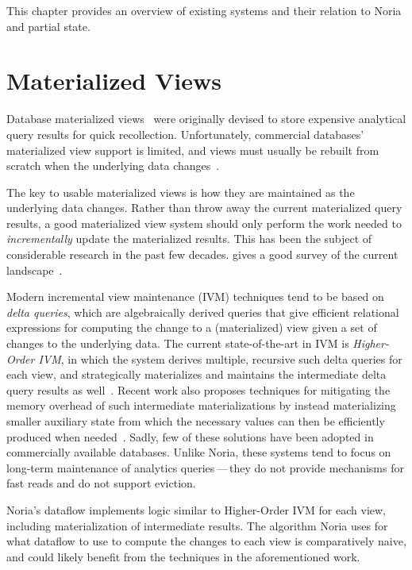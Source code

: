 This chapter provides an overview of existing systems and their relation to
Noria and partial state.

\section{Materialized Views}

Database materialized views~\cite{materialized-views} were originally devised to
store expensive analytical query results for quick recollection. Unfortunately,
commercial databases' materialized view support is limited, and views must
usually be rebuilt from scratch when the underlying data
changes~\cite{materialized-view-selection-sql-server,mssql-materialized-view-restrictions-blog,
mssql-materialized-view-restrictions}.

The key to usable materialized views is how they are maintained as the
underlying data changes. Rather than throw away the current materialized query
results, a good materialized view system should only perform the work needed to
\textit{incrementally} update the materialized results. This has been the
subject of considerable research in the past few decades.
\citeauthor{materialized-survey} gives a good survey of the current
landscape~\cite{materialized-survey}.

Modern incremental view maintenance (IVM) techniques tend to be based on
\textit{delta queries}, which are algebraically derived queries that give
efficient relational expressions for computing the change to a (materialized)
view given a set of changes to the underlying data. The current state-of-the-art
in IVM is \textit{Higher-Order IVM}, in which the system derives multiple,
recursive such delta queries for each view, and strategically materializes and
maintains the intermediate delta query results as well~\cite{dbtoaster, hotdog}.
Recent work also proposes techniques for mitigating the memory overhead of such
intermediate materializations by instead materializing smaller auxiliary state
from which the necessary values can then be efficiently produced when
needed~\cite{memory-efficient}. Sadly, few of these solutions have been adopted
in commercially available databases. Unlike Noria, these systems tend to focus
on long-term maintenance of analytics queries\,---\,they do not provide
mechanisms for fast reads and do not support eviction.

Noria's dataflow implements logic similar to Higher-Order IVM for each view,
including materialization of intermediate results. The algorithm Noria uses for
what dataflow to use to compute the changes to each view is comparatively naive,
and could likely benefit from the techniques in the aforementioned work.


